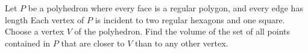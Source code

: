 Let $ P$ be a polyhedron where every face is a regular polygon, and every edge has length  Each vertex of $ P$ is incident to two regular hexagons and one square. Choose a vertex $ V$ of the polyhedron. Find the volume of the set of all points contained in $ P$ that are closer to $ V$ than to any other vertex.